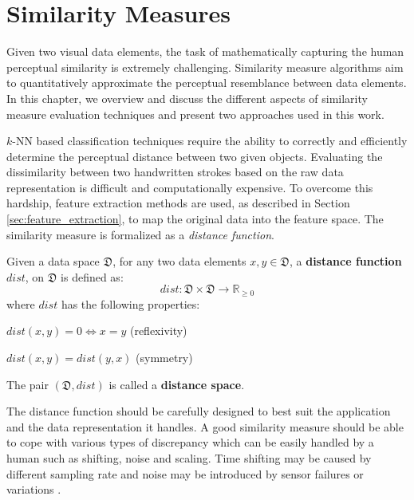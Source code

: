 \newpage{}

\section{Similarity Measures}
\label{sec:similarity_measures}

\iftoggle{edit-mode}{\hspace{0pt}\marginpar{Introduction}}{}
Given two visual data elements, the task of mathematically capturing the human perceptual similarity is extremely challenging. 
Similarity measure algorithms aim to quantitatively approximate the perceptual resemblance between data elements. In this chapter, we overview and discuss the different aspects of similarity measure evaluation techniques and present two approaches used in this work.

\iftoggle{edit-mode}{\hspace{0pt}\marginpar{Intuition}}{}
$k$-NN based classification techniques require the ability to correctly and efficiently determine the perceptual distance between two given objects.
Evaluating the dissimilarity between two handwritten strokes based on the raw data representation is difficult and computationally expensive. 
To overcome this hardship, feature extraction methods are used, as described in Section \ref{sec:feature_extraction}, to map the original data into the feature space.  
The similarity measure is formalized as a \emph{distance function}. 
\begin{definition}
Given a data space $\mathfrak{D}$, for any two data elements $x,y \in \mathfrak{D}$, a \textbf{distance function} $dist$, on $\mathfrak{D}$ is defined as:
\begin{equation}
dist: \mathfrak{D} \times \mathfrak{D} \longrightarrow \mathbb R_{\geq 0} 
\end{equation}
where $dist$ has the following properties:
\begin{compactitem}
\item $dist(x,y)=0 \Leftrightarrow x=y$ (reflexivity)
\item $dist(x,y) = dist(y,x)$ (symmetry)
\end{compactitem}
The pair $(\mathfrak{D},dist)$ is called a \textbf{distance space}.
\label{def:distance_function}
\end{definition}

\iftoggle{edit-mode}{\hspace{0pt}\marginpar{Properties of a good dissimilarity measure.}}{}
The distance function should be carefully designed to best suit the application and the data representation it handles.
A good similarity measure should be able to cope with various types of discrepancy which can be easily handled by a human such as shifting, noise and scaling. Time shifting may be caused by different sampling rate and noise may be introduced by sensor failures or variations \cite{chen2005similarity}.

